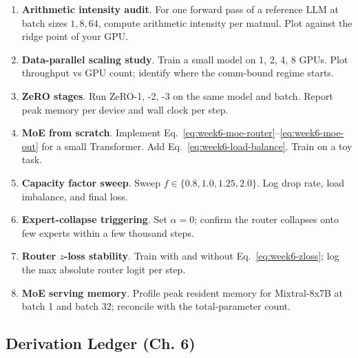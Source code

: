 \begin{enumerate}
  \item \textbf{Arithmetic intensity audit}. For one forward pass of
        a reference LLM at batch sizes $1, 8, 64$, compute
        arithmetic intensity per matmul. Plot against the ridge
        point of your GPU.
  \item \textbf{Data-parallel scaling study}. Train a small model on
        1, 2, 4, 8 GPUs. Plot throughput vs GPU count; identify
        where the comm-bound regime starts.
  \item \textbf{ZeRO stages}. Run ZeRO-1, -2, -3 on the same model
        and batch. Report peak memory per device and wall clock per
        step.
  \item \textbf{MoE from scratch}. Implement Eq.\
        \eqref{eq:week6-moe-router}--\eqref{eq:week6-moe-out} for a
        small Transformer. Add Eq.\ \eqref{eq:week6-load-balance}.
        Train on a toy task.
  \item \textbf{Capacity factor sweep}. Sweep $f \in \{0.8, 1.0,
        1.25, 2.0\}$. Log drop rate, load imbalance, and final loss.
  \item \textbf{Expert-collapse triggering}. Set $\alpha = 0$;
        confirm the router collapses onto few experts within a few
        thousand steps.
  \item \textbf{Router $z$-loss stability}. Train with and without
        Eq.\ \eqref{eq:week6-zloss}; log the max absolute router
        logit per step.
  \item \textbf{MoE serving memory}. Profile peak resident memory
        for Mixtral-8x7B at batch 1 and batch 32; reconcile with the
        total-parameter count.
\end{enumerate}

\subsection*{Derivation Ledger (Ch. 6)}

